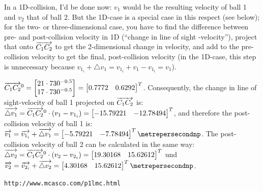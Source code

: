 \documentclass[math,plainoldenumerate,afour]{homework}
\begin{document}
In a 1D-collision, I'd be done now: $v_1$ would be the resulting velocity
of ball 1 and $v_2$ that of ball 2. But the 1D-case is a special case
in this respect (see below); for the two- or three-dimensional case,
you have to find the difference between pre- and post-collision velocity
in 1D (``change in line of sight -velocity''), project that onto $\overrightarrow{C_1C_2}$
to get the 2-dimensional change in velocity, and add to the pre-collision
velocity to get the final, post-collision velocity (in the 1D-case, this
step is unnecessary because $v_{1_i}+\triangle v_1=v_{1_i}+v_1-v_{1_i}=v_1$).

$\overrightarrow{C_1C_2}^0 = \begin{bmatrix}21\cdot {730}^{-0.5} \\ 17\cdot {730}^{-0.5}\end{bmatrix}
=\begin{bmatrix}0.7772 & 0.6292\end{bmatrix}^T$.
Consequently, the change in line of sight-velocity of ball 1 projected
on $\overrightarrow{C_1C_2}$ is:
$\overrightarrow{\triangle v_1}=\overrightarrow{C_1C_2}^0\cdot(v_1-v_{1_i})
=\begin{bmatrix}-15.79221 & -12.78494\end{bmatrix}^T$,
and therefore the post-collision velocity of ball 1 is:
$\vone = \vonei + \overrightarrow{\triangle v_1}
=\flatvectortwo{-5.79221}{-7.78494}\metrepersecondnp$.
The post-collision velocity of ball 2 can be calculated in the same way:
$\overrightarrow{\triangle v_2}=\overrightarrow{C_1C_2}^0\cdot(v_2-v_{2_i})
=\begin{bmatrix}19.30168 & 15.62612\end{bmatrix}^T$
und $\vect{v_2}=\vect{v_{2_i}}+\overrightarrow{\triangle v_2}
=\flatvectortwo{4.30168}{15.62612}\metrepersecondnp$.

\begin{thebibliography}{1}
 \texttt{http://www.mcasco.com/p1lmc.html}
\end{thebibliography}
\end{document}

